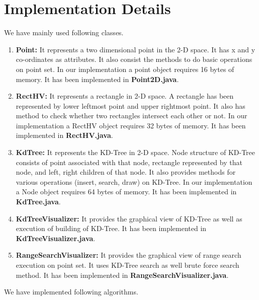 \documentclass[paper=a4, fontsize=11pt]{scrartcl}
\numberwithin{equation}{section}		%
\numberwithin{figure}{section}			%
\numberwithin{table}{section}				%
\begin{document}
\section{Implementation Details}
We have mainly used following classes.
\begin{enumerate}
\item \textbf{Point:} It represents a two dimensional point in the 2-D space. It has x and y co-ordinates as attributes. It also consist the methods to do basic operations on point set. In our implementation a point object requires 16 bytes of memory. It has been implemented in \textbf{Point2D.java}.
\item \textbf{RectHV:} It represents a rectangle in 2-D space. A rectangle has been represented by lower leftmost point and upper rightmost point. It also has method to check whether two rectangles intersect each other or not. In our implementation a RectHV object requires 32 bytes of memory. It has been implemented in \textbf{RectHV.java}.
\item \textbf{KdTree:} It represents the KD-Tree in 2-D space. Node structure of KD-Tree consists of point associated with that node, rectangle represented by that node, and left, right children of that node. It also provides methods for various operations (insert, search, draw) on KD-Tree. In our implementation a Node object requires 64 bytes of memory. It has been implemented in \textbf{KdTree.java}.
\item \textbf{KdTreeVisualizer:} It provides the graphical view of KD-Tree as well as execution of building of KD-Tree. It has been implemented in \textbf{KdTreeVisualizer.java}.

\item \textbf{RangeSearchVisualizer:} It provides the graphical view of range search execution on point set. It uses KD-Tree search as well brute force search method. It has been implemented in \textbf{RangeSearchVisualizer.java}.
\end{enumerate}
\pagebreak
We have implemented following algorithms.\\
\end{document}

